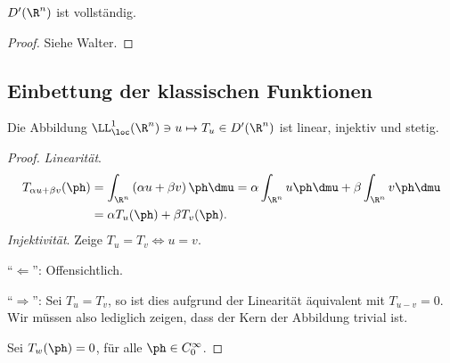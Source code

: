 \begin{prop}
\label{prop:3.6}
$D'(\R^n)$ ist vollständig.\fishhere
\end{prop}
\begin{proof}
Siehe Walter.\qedhere
\end{proof}

\subsection{Einbettung der klassischen Funktionen}

\begin{prop}
\label{prop:3.7}
Die Abbildung $\LL_\loc^1(\R^n)\ni u\mapsto T_u\in D'(\R^n)$ ist linear,
injektiv und stetig.\fishhere
\end{prop}
\begin{proof}
\textit{Linearität}.
\begin{align*}
T_{\alpha u + \beta v}(\ph)  &= \int_{\R^n} \left(\alpha u + \beta v\right)\ph
\dmu = \alpha\int_{\R^n} u\ph \dmu + \beta\int_{\R^n} v\ph\dmu \\ &= \alpha
T_u(\ph) + \beta T_v(\ph).
\end{align*}
\textit{Injektivität}. Zeige $T_u = T_v \Leftrightarrow u=v$.

``$\Leftarrow$'': Offensichtlich.

``$\Rightarrow$'': Sei $T_u = T_v$, so ist dies aufgrund der Linearität 
äquivalent mit $T_{u-v} = 0$. Wir müssen also lediglich zeigen, dass der Kern
der Abbildung trivial ist.

Sei $T_w(\ph) = 0$, für alle $\ph\in C_0^\infty$.


\end{proof}
